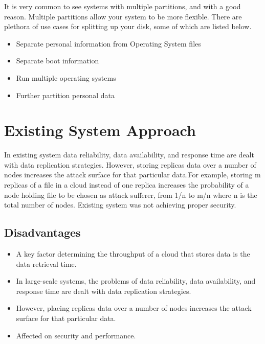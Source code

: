 It is very common to see systems with multiple partitions, and with a good
reason. Multiple partitions allow your system to be more flexible. There are
plethora of use cases for splitting up your disk, some of which are listed
below.

\begin{itemize}
    \item Separate personal information from Operating System files
    \item Separate boot information
    \item Run multiple operating systems
    \item Further partition personal data
\end{itemize}


\chapter{Existing System Approach}
In existing system data reliability, data availability, and response time are dealt with data replication strategies. However, storing replicas data over a number of nodes increases the attack surface for that particular data.For example, storing m replicas of a file in a cloud instead of one replica increases the probability of a node holding file to be chosen as attack sufferer, from 1/n to m/n where n is the total number of nodes. Existing system was not achieving proper security.
\section{Disadvantages}
\begin{itemize}
	\item   A key factor determining the throughput of a cloud that stores data is the data retrieval time.
	\item   In large-scale systems, the problems of data reliability, data availability, and response time are dealt with data replication strategies.
	\item   However, placing replicas data over a number of nodes increases the attack surface for that particular data.
	\item   Affected on security and performance.  
\end{itemize}
